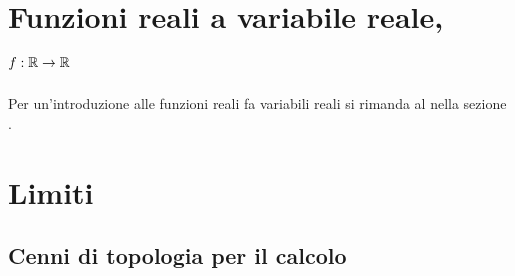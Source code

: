\documentclass[letterpaper,10pt,italian]{jupyterBook}
\begin{document}
\section{Funzioni reali a variabile reale, \protect\(f: \mathbb{R} \rightarrow \mathbb{R}\protect\)}
\label{\detokenize{ch/infinitesimal_calculus/analysis:funzioni-reali-a-variabile-reale-f-mathbb-r-rightarrow-mathbb-r}}\label{\detokenize{ch/infinitesimal_calculus/analysis:infinitesimal-calculus-analysis-real-functions}}
\sphinxAtStartPar
Per un’introduzione alle funzioni reali fa variabili reali si rimanda al {\hyperref[\detokenize{ch/precalculus/real-functions:math-hs-precalculus-real-functions}]{}} nella sezione {\hyperref[\detokenize{ch/precalculus:math-hs-precalculus}]{}}.




\section{Limiti}
\label{\detokenize{ch/infinitesimal_calculus/analysis:limiti}}\label{\detokenize{ch/infinitesimal_calculus/analysis:infinitesimal-calculus-limits}}

\subsection{Cenni di topologia per il calcolo}
\label{\detokenize{ch/infinitesimal_calculus/analysis:cenni-di-topologia-per-il-calcolo}}
\sphinxAtStartPar
{} 
\end{document}
